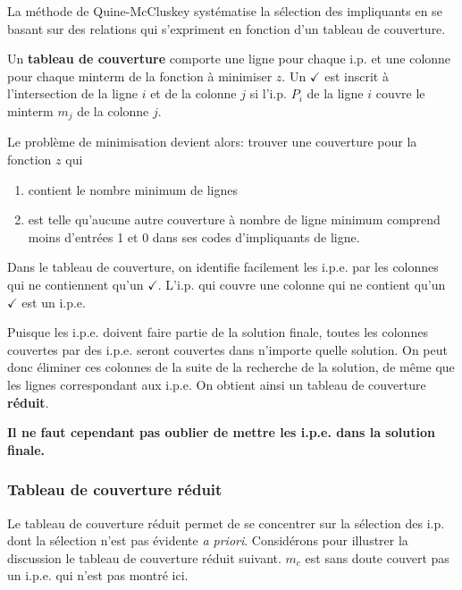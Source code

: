 \documentclass[11pt]{article}
\begin{document}
La méthode de Quine-McCluskey systématise la sélection des impliquants
en se basant sur des relations qui s'expriment en fonction d'un
tableau de couverture.

Un \textbf{tableau de couverture} comporte une ligne pour chaque i.p. et une
colonne pour chaque minterm de la fonction à minimiser \(z\). Un \(\checkmark\) est
inscrit à l'intersection de la ligne \(i\) et de la colonne  \(j\) si
l'i.p.  \(P_i\) de la ligne  \(i\) couvre le minterm  \(m_j\) de la colonne
 \(j\).

Le problème de minimisation devient alors: trouver une couverture pour
la fonction \(z\) qui

\begin{enumerate}
\item contient le nombre minimum de lignes

\item est telle qu'aucune autre couverture à nombre de ligne minimum
comprend moins d'entrées 1 et 0 dans ses codes d'impliquants de
ligne.
\end{enumerate}

Dans le tableau de couverture, on identifie facilement les i.p.e. par
les colonnes qui ne contiennent qu'un \(\checkmark\). L'i.p. qui couvre une colonne
qui ne contient qu'un \(\checkmark\) est un i.p.e.

Puisque les i.p.e. doivent faire partie de la solution finale, toutes
les colonnes couvertes par des i.p.e. seront couvertes dans n'importe
quelle solution. On peut donc éliminer ces colonnes de la suite de la
recherche de la solution, de même que les lignes correspondant aux
i.p.e. On obtient ainsi un tableau de couverture \textbf{réduit}.

\textbf{Il ne faut cependant pas oublier de mettre les i.p.e. dans la solution
finale.}

\subsubsection{Tableau de couverture réduit}
\label{sec:orgc811ad8}

Le tableau de couverture réduit permet de se concentrer sur la
sélection des i.p. dont la sélection n'est pas évidente \emph{a
priori}. Considérons pour illustrer la discussion le tableau de
couverture réduit suivant. \(m_c\) est sans doute couvert pas un
i.p.e. qui n'est pas montré ici.
\end{document}
